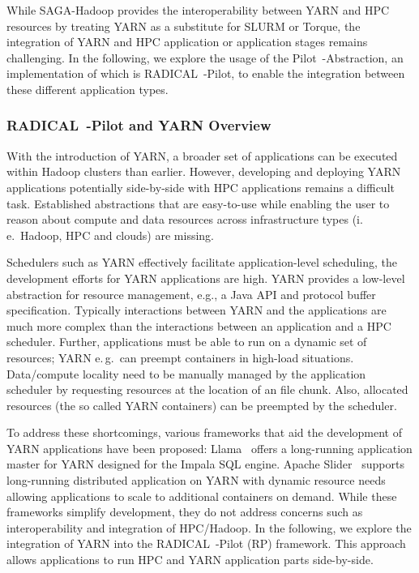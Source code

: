 While SAGA-Hadoop provides the interoperability between YARN and HPC resources by treating YARN as a substitute for SLURM or Torque, the integration of YARN and HPC application or application stages remains challenging.
In the following, we explore the usage of the Pilot~-Abstraction, an implementation of which is RADICAL~-Pilot, to enable the integration between these different application types.

\subsubsection{RADICAL~-Pilot and YARN Overview}
\label{sssec:rp-impl}
With the introduction of YARN, a broader set of applications can be executed within Hadoop clusters than earlier.
However, developing and deploying YARN applications potentially side-by-side with HPC applications remains a difficult task.
Established abstractions that are easy-to-use while enabling the user to reason about compute and data resources across infrastructure types (i.\,e.\ Hadoop, HPC and clouds) are missing. 

Schedulers such as YARN effectively facilitate application-level scheduling, the development efforts for YARN applications are high. YARN provides a low-level abstraction for resource management, e.g., a Java API and protocol buffer specification.
Typically interactions between YARN and the applications are much more complex than the interactions between an application and a HPC scheduler.
Further, applications must be able to run on a dynamic set of resources; YARN e.\,g.\ can preempt containers in high-load situations.
Data/compute locality need to be manually managed by the application scheduler by requesting resources at the location of an file chunk.
Also, allocated resources (the so called YARN containers) can be preempted by the scheduler.

To address these shortcomings, various frameworks that aid the development of YARN applications have been proposed: Llama~\cite{llama} offers a long-running application master for YARN designed for the Impala SQL engine.
Apache Slider~\cite{apache-slider} supports long-running distributed application on YARN with dynamic resource needs allowing applications to scale to additional containers on demand.
While these frameworks simplify development, they do not address concerns such as interoperability and integration of HPC/Hadoop.
In the following, we explore the integration of YARN into the RADICAL~-Pilot (RP) framework.
This approach allows applications to run HPC and YARN application parts side-by-side.

